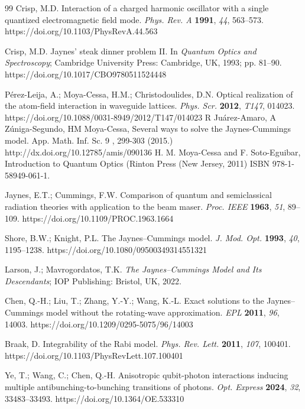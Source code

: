 \documentclass[10pt]{NSP1}
\begin{document}
\begin{thebibliography}{99}
Crisp, M.D. Interaction of a charged harmonic oscillator with a single quantized electromagnetic field mode. 
\textit{Phys. Rev. A} \textbf{1991}, \textit{44}, 563--573.
https://doi.org/10.1103/PhysRevA.44.563

Crisp, M.D. Jaynes' steak dinner problem II. In \textit{Quantum Optics and Spectroscopy}; 
Cambridge University Press: Cambridge, UK, 1993; pp. 81--90.
https://doi.org/10.1017/CBO9780511524448

P\'{e}rez-Leija, A.; Moya-Cessa, H.M.; Christodoulides, D.N. Optical realization of the atom-field interaction in waveguide lattices. 
\textit{Phys. Scr.} \textbf{2012}, \textit{T147}, 014023.
https://doi.org/10.1088/0031-8949/2012/T147/014023
 R Juárez-Amaro, A Zúniga-Segundo, HM Moya-Cessa, Several ways to solve the Jaynes-Cummings model. App. Math. Inf. Sc. 9 , 299-303 (2015.) http://dx.doi.org/10.12785/amis/090136
 H. M. Moya-Cessa and F. Soto-Eguibar, Introduction to Quantum Optics (Rinton Press (New Jersey, 2011) ISBN 978-1-58949-061-1.

Jaynes, E.T.; Cummings, F.W. Comparison of quantum and semiclassical radiation theories with application to the beam maser. 
\textit{Proc. IEEE} \textbf{1963}, \textit{51}, 89--109.
https://doi.org/10.1109/PROC.1963.1664

Shore, B.W.; Knight, P.L. The Jaynes--Cummings model. 
\textit{J. Mod. Opt.} \textbf{1993}, \textit{40}, 1195--1238.
https://doi.org/10.1080/09500349314551321

Larson, J.; Mavrogordatos, T.K. \textit{The Jaynes--Cummings Model and Its Descendants}; 
IOP Publishing: Bristol, UK, 2022.

Chen, Q.-H.; Liu, T.; Zhang, Y.-Y.; Wang, K.-L. Exact solutions to the Jaynes--Cummings model without the rotating-wave approximation. 
\textit{EPL} \textbf{2011}, \textit{96}, 14003.
https://doi.org/10.1209/0295-5075/96/14003

Braak, D. Integrability of the Rabi model. 
\textit{Phys. Rev. Lett.} \textbf{2011}, \textit{107}, 100401.
https://doi.org/10.1103/PhysRevLett.107.100401

Ye, T.; Wang, C.; Chen, Q.-H. Anisotropic qubit-photon interactions inducing multiple antibunching-to-bunching transitions of photons. 
\textit{Opt. Express} \textbf{2024}, \textit{32}, 33483--33493.
https://doi.org/10.1364/OE.533310


\end{thebibliography}
\end{document}

